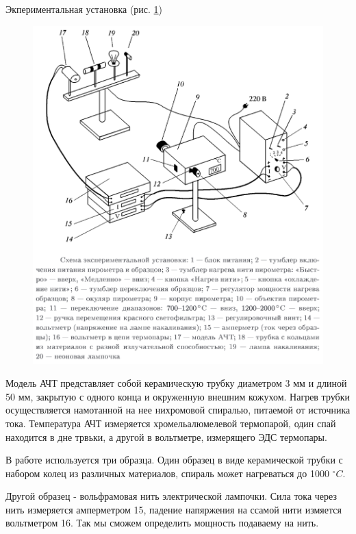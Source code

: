 \documentclass[a4paper]{article}
\begin{document}
Экпериментальная установка (рис. \ref{setup})

\begin{figure}[H]
    \begin{center}
    \includegraphics[scale = 0.6]{setup.png}
    \caption{}
    \label{setup}
    \end{center}
\end{figure}

Модель АЧТ представляет собой керамическую трубку диаметром 3 мм и длиной 50 мм, закрытую с одного конца и окруженную внешним кожухом.
Нагрев трубки осуществляется намотанной на нее нихромовой спиралью, питаемой от источника тока. 
Температура АЧТ измеряется хромельалюмелевой термопарой, один спай находится в дне трвьки, а другой 
в вольтметре, измерящего ЭДС термопары.\par 

В работе используется три образца. Один образец в виде керамической трубки с набором колец 
из различных материалов, спираль может нагреваться до 1000 $^{\circ} C$. \par 

Другой образец - вольфрамовая нить электрической лампочки. Сила тока через нить измеряется амперметром 15, падение 
напяржения на ссамой нити измяется вольтметром 16. Так мы сможем определить мощность подаваему на нить. 
\end{document}
